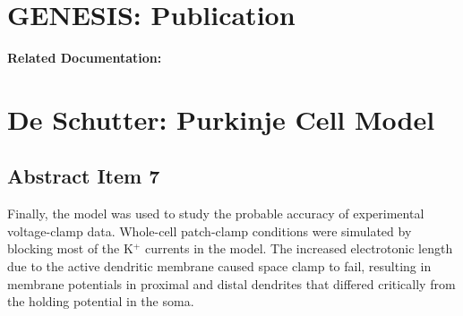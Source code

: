 \documentclass[12pt]{article}
\begin{document}
\section*{GENESIS: Publication}

{\bf Related Documentation:}

\section*{De Schutter: Purkinje Cell Model}

\subsection*{Abstract Item 7}

Finally, the model was used to study the probable accuracy
of experimental voltage-clamp data. Whole-cell patch-clamp conditions
were simulated by blocking most of the K$^+$ currents in the
model. The increased electrotonic length due to the active dendritic
membrane caused space clamp to fail, resulting in membrane
potentials in proximal and distal dendrites that differed critically
from the holding potential in the soma.
\end{document}
